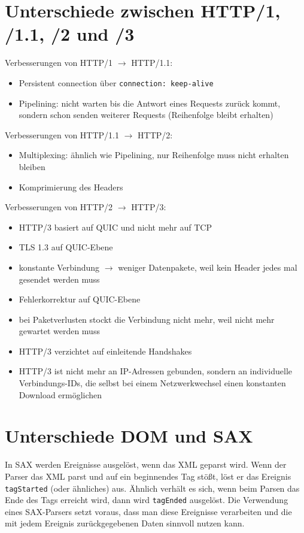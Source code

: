 \documentclass{article}
\begin{document}
	\section*{Unterschiede zwischen HTTP/1, /1.1, /2 und /3}
	
	Verbesserungen von HTTP/1 $\to$ HTTP/1.1:
	\begin{itemize}
		\item Persistent connection über \texttt{connection: keep-alive}
		\item Pipelining: nicht warten bis die Antwort eines Requests zurück kommt, sondern schon senden weiterer Requests (Reihenfolge bleibt erhalten)
	\end{itemize}

	Verbesserungen von HTTP/1.1 $\to$ HTTP/2:
	\begin{itemize}
		\item Multiplexing: ähnlich wie Pipelining, nur Reihenfolge muss nicht erhalten bleiben
		\item Komprimierung des Headers
	\end{itemize}

	Verbesserungen von HTTP/2 $\to$ HTTP/3:
	\begin{itemize}
		\item HTTP/3 basiert auf QUIC und nicht mehr auf TCP
		\item TLS 1.3 auf QUIC-Ebene
		\item konstante Verbindung $\to$ weniger Datenpakete, weil kein Header jedes mal gesendet werden muss
		\item Fehlerkorrektur auf QUIC-Ebene
		\item bei Paketverlusten stockt die Verbindung nicht mehr, weil nicht mehr gewartet werden muss
		\item HTTP/3 verzichtet auf einleitende Handshakes
		\item HTTP/3 ist nicht mehr an IP-Adressen gebunden, sondern an individuelle Verbindungs-IDs, die selbst bei einem Netzwerkwechsel einen konstanten Download ermöglichen
	\end{itemize}
	
	\section*{Unterschiede DOM und SAX}
	
	In SAX werden Ereignisse ausgelöst, wenn das XML geparst wird. Wenn der Parser das XML parst und auf ein beginnendes Tag stößt, löst er das Ereignis \texttt{tagStarted} (oder ähnliches) aus. Ähnlich verhält es sich, wenn beim Parsen das Ende des Tags erreicht wird, dann wird \texttt{tagEnded} ausgelöst. Die Verwendung eines SAX-Parsers setzt voraus, dass man diese Ereignisse verarbeiten und die mit jedem Ereignis zurückgegebenen Daten sinnvoll nutzen kann.
	
\end{document}
